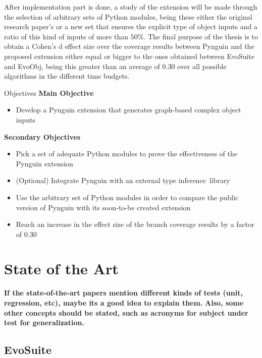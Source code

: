 \documentclass[%
  chapterprefix=false,%
  open=right,%
  twoside=true,%
  paper=a4,%
  logofile={Figures/logo.png},%
  thesistype=master,%
  UKenglish,%
]{se2thesis}
\begin{document}
After implementation part is done, a study of the extension will be made through the selection of arbitrary sets of Python modules, being these either the original research paper's or a new set that ensures the explicit type of object inputs and a ratio of this kind of inputs of more than $50\%$.
The final purpose of the thesis is to obtain a Cohen's d effect size over the coverage results between Pynguin and the proposed extension either equal or bigger to the ones obtained between EvoSuite and EvoObj, being this greater than an average of $0.30$ over all possible algorithms in the different time budgets.

\begin{summary}{Objectives}
\centering\textbf{Main Objective}
\begin{itemize}
\item  Develop a Pynguin extension that generates graph-based complex object inputs
\end{itemize}
\centering\textbf{Secondary Objectives}
\begin{itemize}
\item  Pick a set of adequate Python modules to prove the effectiveness of the Pynguin extension
\item (Optional) Integrate Pynguin with an external type inference~library
\item Use the arbitrary set of Python modules in order to compare the public version of Pynguin with its soon-to-be created extension
\item Reach an increase in the effect size of the branch coverage results by a factor of \(0.30\)
\end{itemize}
\end{summary}

\chapter{State of the Art}

\textbf{If the state-of-the-art papers mention different kinds of tests (unit, regression, etc), maybe its a good idea to explain them.}
\textbf{Also, some other concepts should be stated, such as acronyms for subject under test for generalization.}

\section{EvoSuite}
\end{document}
